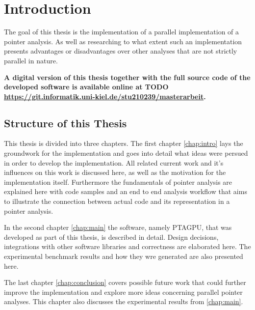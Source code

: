 \chapter{Introduction} \label{chap:intro}
The goal of this thesis is the implementation of a parallel implementation of a pointer analysis. As well as researching to what extent such an implementation presents advantages or disadvantages over other analyses that are not strictly parallel in nature.
\begin{center}
    \textbf{A digital version of this thesis together with the full source code of the developed software is available online at TODO\\
        \href{https://git.informatik.uni-kiel.de/stu210239/masterarbeit}{https://git.informatik.uni-kiel.de/stu210239/masterarbeit}.}
\end{center}
\section{Structure of this Thesis}
This thesis is divided into three chapters.
The first chapter \autoref{chap:intro} lays the groundwork for the implementation and goes into detail what ideas were persued in order to develop the implementation. All related current work and it's influences on this work is discussed here, as well as the motivation for the implementation itself. Furthermore the fundamentals of pointer analysis are explained here with code samples and an end to end analysis workflow that aims to illustrate the connection between actual code and its representation in a pointer analysis.

In the second chapter \autoref{chap:main} the software, namely PTAGPU, that was developed as part of this thesis, is described in detail. Design decisions, integrations with other software libraries and correctness are elaborated here.
The experimental benchmark results and how they wre generated are also presented here.

The last chapter \autoref{chap:conclusion} covers possible future work that could further improve the implementation and explore more ideas concerning parallel pointer analyses.
This chapter also discusses the experimental results from \autoref{chap:main}.


